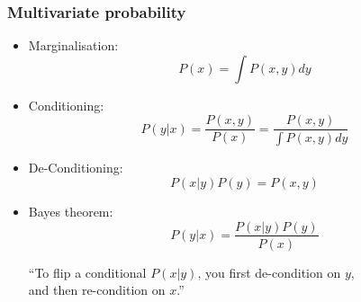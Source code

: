 \documentclass[%
]{beamer}
\begin{document}
\begin{frame}
    \frametitle{Multivariate probability}
    \begin{itemize}
        \item Marginalisation:
            \begin{equation*}
                P(x) = \int P(x,y) dy
            \end{equation*}
        \item Conditioning:
            \begin{equation*}
                P(y|x) = \frac{P(x,y)}{P(x)} = \frac{P(x,y)}{\int P(x,y) dy}
            \end{equation*}
        \item De-Conditioning:
            \begin{equation*}
                P(x|y) P(y) = P(x,y)
            \end{equation*}
        \item Bayes theorem:
            \begin{equation*}
                P(y|x) = \frac{P(x|y) P(y)}{P(x)}
            \end{equation*}
            \begin{center}
                ``To flip a conditional $P(x|y)$, you first de-condition on $y$,\\ and then re-condition on $x$.''
            \end{center}
    \end{itemize}
\end{frame}


\end{document}

